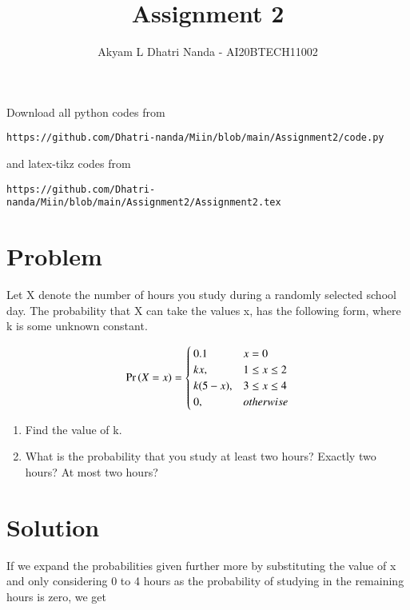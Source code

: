 \documentclass[journal,12pt,twocolumn]{IEEEtran}
\begin{document}
     \def\rightbox#1{\makebox[0in][r]{#1}}
     \def\centbox#1{\makebox[0in]{#1}}
     \def\topbox#1{\raisebox{-\baselineskip}[0in][0in]{#1}}
     \def\midbox#1{\raisebox{-0.5\baselineskip}[0in][0in]{#1}}
\vspace{3cm}
\title{Assignment 2}
\author{Akyam L Dhatri Nanda - AI20BTECH11002}
\maketitle
\newpage
\bigskip
\renewcommand{\thefigure}{\theenumi}
\renewcommand{\thetable}{\theenumi}
Download all python codes from 
\begin{lstlisting}
https://github.com/Dhatri-nanda/Miin/blob/main/Assignment2/code.py
\end{lstlisting}
%
and latex-tikz codes from 
%
\begin{lstlisting}
https://github.com/Dhatri-nanda/Miin/blob/main/Assignment2/Assignment2.tex
\end{lstlisting}
\section{Problem}
Let X denote the number of hours you study during a randomly selected school day. The probability that X can take the values x, has the following form, where k is some unknown constant.

\begin{align}
    \Pr\left(X = x\right) = 
    \begin{cases}
        0.1 & x = 0\\
        kx, &  1 \le x \le 2\\
        k(5-x), & 3 \le x \le 4\\
        0, & otherwise
        \end{cases}
 \end{align}
  
  \begin{enumerate}[label={\Alph*)}]
   \item Find the value of k.
   \item What is the probability that you study at least two hours? Exactly two hours? At most two hours?
  \end{enumerate}
  
  \section{Solution}
  
  If we expand the probabilities given further more by substituting the value of x and only considering 0 to 4 hours as the probability of studying in the remaining hours is zero, we get
  
\end{document}
